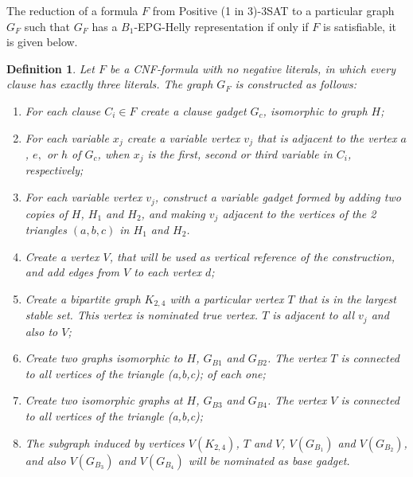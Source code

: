 \documentclass[9pt]{entcs}
\newtheorem{defi}{Definition}[section]
\begin{document}
The reduction of a formula $F$ from  {\sc Positive (1 in 3)-3SAT}  to a particular graph $G_F$ such that $G_F$ has a $B_{1}$-EPG-Helly representation if only if $F$ is satisfiable, it is given below.

\begin{defi}\label{sec:reducao}
Let $F$ be a CNF-formula with no negative literals, in which every clause has exactly three literals. The graph $G_F$ is constructed as follows:

\begin{enumerate}
\item For each clause $C_i \in F$ create a  \textit{clause gadget} $G_{c}$, isomorphic to  graph $H$;

\item For each variable $x_{j}$ create a \emph{variable vertex} $v_{j}$ that is adjacent to the vertex $a$, $e,$ or $h$ of $G_c$, when $x_{j}$ is the first, second or third variable in $C_i$, respectively;

\item For each variable vertex $v_{j}$, construct a \emph{variable gadget} formed by adding two copies of $H$, $H_1$ and $H_2$, and making $v_j$ adjacent to the vertices of the 2 triangles $(a, b, c)$ in  $H_1$ and $H_2$.



\item Create a vertex $V$, that will be used as vertical reference of the construction, and add edges from $V$ to each vertex  $d$;%

\item Create a bipartite graph $K_{2,4}$ with a particular vertex $T$ that is in the largest stable set. This vertex is nominated \emph{true vertex}. $T$ is adjacent to all $v_{j}$ and also to $V$;

\item Create two  graphs isomorphic to $H$, $G_{B1}$ and $G_{B2}$. The vertex $T$ is connected to all vertices of the triangle (a,b,c); %
of each one;


\item Create two isomorphic graphs at $H$, $G_{B3}$ and $G_{B4}$. The vertex $V$ is connected to all vertices of the triangle (a,b,c);%

\item The  subgraph induced by vertices $V(K_{2,4})$, $T$ and $V$,  $V(G_{B_1})$ and $V(G_{B_2})$, and also $V(G_{B_3})$ and $V(G_{B_4})$ will be nominated as \emph{base gadget}. 
\end{enumerate}
\end{defi}
\end{document}
